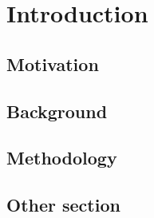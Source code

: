 \chapter{Introduction}

\section{Motivation}

\section{Background}

\section{Methodology}

\section{Other section}
